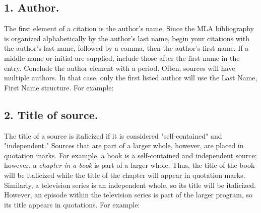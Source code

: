 \subsection{1. Author.}

The first element of a citation is the author's name. Since the MLA bibliography is organized alphabetically by the author's last name, begin your citations with the author's last name, followed by a comma, then the author's first name. If a middle name or initial are supplied, include those after the first name in the entry. Conclude the author element with a period. Often, sources will  have multiple authors. In that case, only the first listed author will use the Last Name, First Name structure. For example: \bigskip


\smallskip
 


\subsection{2. Title of source.}

The title of a source is italicized if it is considered "self-contained" and "independent." Sources that are part of a larger whole, however, are placed in quotation marks. For example, a book is a self-contained and independent source; however, a \emph{chapter in a book} is part of a larger whole. Thus, the title of the book will be italicized while the title of the chapter will appear in quotation marks. Similarly, a television series is an independent whole, so its title will be italicized. However, an episode within the television series is part of the larger program, so its title appears in quotations. For example: \bigskip 


\smallskip



